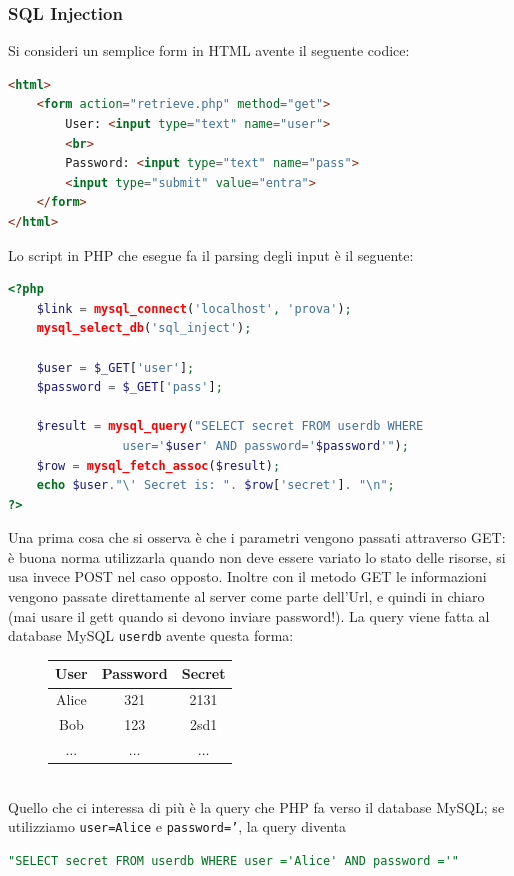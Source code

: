 \subsubsection{SQL Injection}
Si consideri un semplice form in HTML avente il seguente codice:
\begin{lstlisting}[language=html]
<html>
	<form action="retrieve.php" method="get">
		User: <input type="text" name="user">
		<br>
		Password: <input type="text" name="pass">
		<input type="submit" value="entra">
	</form>
</html>
\end{lstlisting}
Lo script in PHP che esegue fa il parsing degli input è il seguente:
\begin{lstlisting}[language=php]
<?php
	$link = mysql_connect('localhost', 'prova');
	mysql_select_db('sql_inject');
	
	$user = $_GET['user'];
	$password = $_GET['pass'];
	
	$result = mysql_query("SELECT secret FROM userdb WHERE
				user='$user' AND password='$password'");
	$row = mysql_fetch_assoc($result);
	echo $user."\' Secret is: ". $row['secret']. "\n";
?>
\end{lstlisting}
Una prima cosa che si osserva è che i parametri vengono passati attraverso GET: è buona norma utilizzarla quando non deve essere variato lo stato delle risorse, si usa invece POST nel caso opposto. Inoltre con il metodo GET le informazioni vengono passate direttamente al server come parte dell'Url, e quindi in chiaro (mai usare il gett quando si devono inviare password!). La query viene fatta al database MySQL \texttt{userdb} avente questa forma:
\begin{figure}[htbp]
	\centering
	\begin{tabular}{|c|c|c|}
		\hline
		\textbf{User} & \textbf{Password} & \textbf{Secret} \\
		\hline
		Alice & 321 & 2131 \\
		\hline
		Bob & 123 & 2sd1 \\
		\hline
		$\dots$ & $\dots$ & $\dots$ \\
		\hline
	\end{tabular}
\end{figure}\\
Quello che ci interessa di più è la query che PHP fa verso il database MySQL; se utilizziamo \texttt{user=Alice} e \texttt{password='}, la query diventa
\begin{lstlisting}[language=sql]
"SELECT secret FROM userdb WHERE user ='Alice' AND password ='"
\end{lstlisting}
